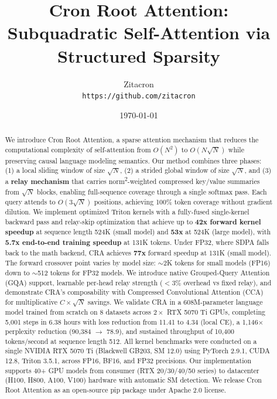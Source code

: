 \documentclass{article}
\title{Cron Root Attention: Subquadratic Self-Attention via Structured Sparsity}
\author{
    Zitacron\\
    \texttt{https://github.com/zitacron}
    }
\date{\today}
\begin{document}
    \maketitle

    \begin{abstract}
    We introduce Cron Root Attention, a sparse attention mechanism that reduces the computational complexity of self-attention from $O(N^2)$ to $O(N\sqrt{N})$ while preserving causal language modeling semantics. Our method combines three phases: (1) a local sliding window of size $\sqrt{N}$, (2) a strided global window of size $\sqrt{N}$, and (3) a \textbf{relay mechanism} that carries norm\textsuperscript{2}-weighted compressed key/value summaries from $\sqrt{N}$ blocks, enabling full-sequence coverage through a single softmax pass. Each query attends to $O(3\sqrt{N})$ positions, achieving 100\% token coverage without gradient dilution. We implement optimized Triton kernels with a fully-fused single-kernel backward pass and relay-skip optimization that achieve up to \textbf{42x forward kernel speedup} at sequence length 524K (small model) and \textbf{53x} at 524K (large model), with \textbf{5.7x end-to-end training speedup} at 131K tokens. Under FP32, where SDPA falls back to the math backend, CRA achieves \textbf{77x} forward speedup at 131K (small model). The forward crossover point varies by model size: $\sim$2K tokens for small models (FP16) down to $\sim$512 tokens for FP32 models. We introduce native Grouped-Query Attention (GQA) support, learnable per-head relay strength ($<$3\% overhead vs fixed relay), and demonstrate CRA's composability with Compressed Convolutional Attention (CCA) for multiplicative $C \times \sqrt{N}$ savings. We validate CRA in a 608M-parameter language model trained from scratch on 8 datasets across $2\times$ RTX 5070 Ti GPUs, completing 5,001 steps in 6.38 hours with loss reduction from 11.41 to 4.34 (local CE), a 1{,}146$\times$ perplexity reduction (90{,}384 $\to$ 78.9), and sustained throughput of 10,400 tokens/second at sequence length 512. All kernel benchmarks were conducted on a single NVIDIA RTX 5070 Ti (Blackwell GB203, SM 12.0) using PyTorch 2.9.1, CUDA 12.8, Triton 3.5.1, across FP16, BF16, and FP32 precisions. Our implementation supports 40+ GPU models from consumer (RTX 20/30/40/50 series) to datacenter (H100, H800, A100, V100) hardware with automatic SM detection. We release Cron Root Attention as an open-source pip package under Apache 2.0 license.
    \end{abstract}
\end{document}
